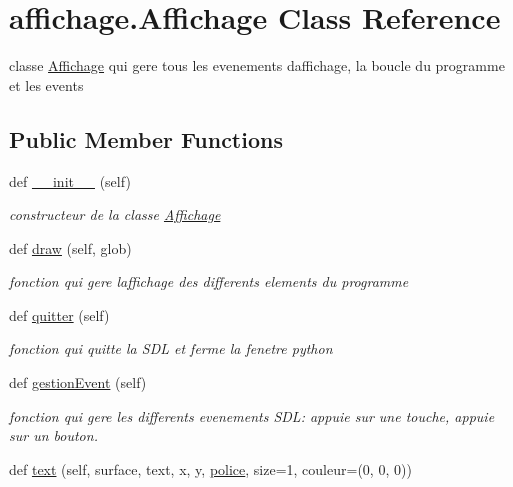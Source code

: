 \hypertarget{classaffichage_1_1_affichage}{}\section{affichage.\+Affichage Class Reference}
\label{classaffichage_1_1_affichage}


classe \hyperlink{classaffichage_1_1_affichage}{Affichage} qui gere tous les evenements d\textquotesingle{}affichage, la boucle du programme et les events  


\subsection*{Public Member Functions}
\begin{DoxyCompactItemize}
\item 
def \hyperlink{classaffichage_1_1_affichage_af97834b8341cdefdf301ece9163f1ee7}{\+\_\+\+\_\+init\+\_\+\+\_\+} (self)
\begin{DoxyCompactList}\small\item\em constructeur de la classe \hyperlink{classaffichage_1_1_affichage}{Affichage} \end{DoxyCompactList}\item 
def \hyperlink{classaffichage_1_1_affichage_a647ba807e5b1382a57620a50260ffd3e}{draw} (self, glob)
\begin{DoxyCompactList}\small\item\em fonction qui gere l\textquotesingle{}affichage des differents elements du programme \end{DoxyCompactList}\item 
def \hyperlink{classaffichage_1_1_affichage_a72099522a0eabcb0be314bc912a2004e}{quitter} (self)
\begin{DoxyCompactList}\small\item\em fonction qui quitte la S\+DL et ferme la fenetre python \end{DoxyCompactList}\item 
def \hyperlink{classaffichage_1_1_affichage_a3ad2f7f2c22a2ff4863af09fd1b3ecd3}{gestion\+Event} (self)
\begin{DoxyCompactList}\small\item\em fonction qui gere les differents evenements S\+DL\+: appuie sur une touche, appuie sur un bouton. \end{DoxyCompactList}\item 
def \hyperlink{classaffichage_1_1_affichage_a05429a4192cb6dea63f08b9565331e89}{text} (self, surface, text, x, y, \hyperlink{classaffichage_1_1_affichage_a5a0678437f947889167137bd1e87108e}{police}, size=1, couleur=(0, 0, 0))

\end{DoxyCompactItemize}
